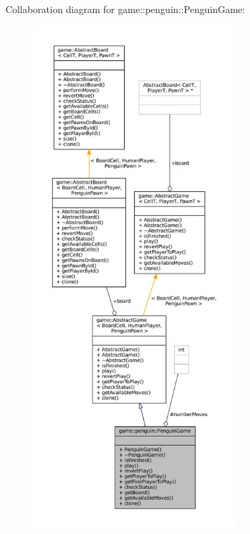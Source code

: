 Collaboration diagram for game\+:\+:penguin\+:\+:Penguin\+Game\+:
\nopagebreak
\begin{figure}[H]
\begin{center}
\leavevmode
\includegraphics[height=550pt]{classgame_1_1penguin_1_1_penguin_game__coll__graph}
\end{center}
\end{figure}
